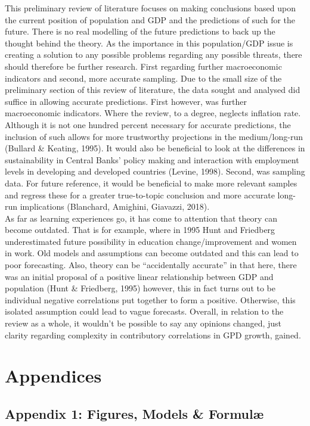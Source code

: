 \documentclass[11pt, english]{article}
\begin{document}
	This preliminary review of literature focuses on making conclusions based upon the current position of population and GDP and the predictions of such for the future. There is no real modelling of the future predictions to back up the thought behind the theory. As the importance in this population/GDP issue is creating a solution to any possible problems regarding any possible threats, there should therefore be further research. First regarding further macroeconomic indicators and second, more accurate sampling. Due to the small size of the preliminary section of this review of literature, the data sought and analysed did suffice in allowing accurate predictions. First however, was further macroeconomic indicators. Where the review, to a degree, neglects inflation rate. Although it is not one hundred percent necessary for accurate predictions, the inclusion of such allows for more trustworthy projections in the medium/long-run (Bullard \& Keating, 1995). It would also be beneficial to look at the differences in sustainability in Central Banks’ policy making and interaction with employment levels in developing and developed countries (Levine, 1998). Second, was sampling data. For future reference, it would be beneficial to make more relevant samples and regress these for a greater true-to-topic conclusion and more accurate long-run implications (Blanchard, Amighini, Giavazzi, 2018).\\

	As far as learning experiences go, it has come to attention that theory can become outdated. That is for example, where in 1995 Hunt and Friedberg underestimated future possibility in education change/improvement and women in work. Old models and assumptions can become outdated and this can lead to poor forecasting. Also, theory can be “accidentally accurate” in that here, there was an initial proposal of a positive linear relationship between GDP and population (Hunt \& Friedberg, 1995) however, this in fact turns out to be individual negative correlations put together to form a positive. Otherwise, this isolated assumption could lead to vague forecasts. Overall, in relation to the review as a whole, it wouldn’t be possible to say any opinions changed, just clarity regarding complexity in contributory correlations in GPD growth, gained.

\newpage

\section{Appendices}

	\subsection{Appendix 1: Figures, Models \& Formul\ae}
\end{document}
